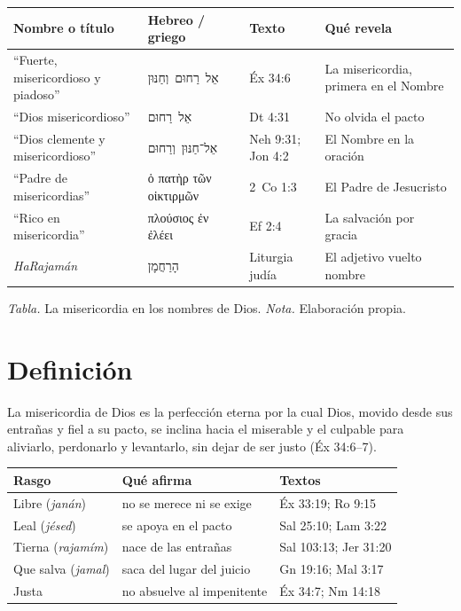 \documentclass[11pt,letterpaper]{article}
\newcommand{\heb}[1]{\mbox{\foreignlanguage{hebrew}{#1}}}
\newcommand{\grc}[1]{\foreignlanguage{ancientgreek}{#1}}
\begin{document}
\begin{center}
\small\renewcommand{\arraystretch}{1.2}
\begin{tabular}{@{}L{4.2cm}L{3.6cm}L{3.0cm}L{4.6cm}@{}}
\toprule
\textbf{Nombre o título} & \textbf{Hebreo / griego} & \textbf{Texto} & \textbf{Qué revela} \\ \midrule
``Fuerte, misericordioso y piadoso'' & \heb{אֵל רַחוּם וְחַנּוּן} & Éx 34:6 & La misericordia, primera en el Nombre \\
``Dios misericordioso'' & \heb{אֵל רַחוּם} & Dt 4:31 & No olvida el pacto \\
``Dios clemente y misericordioso'' & \heb{אֵל־חַנּוּן וְרַחוּם} & Neh 9:31; Jon 4:2 & El Nombre en la oración \\
``Padre de misericordias'' & \grc{ὁ πατὴρ τῶν οἰκτιρμῶν} & 2~Co 1:3 & El Padre de Jesucristo \\
``Rico en misericordia'' & \grc{πλούσιος ἐν ἐλέει} & Ef 2:4 & La salvación por gracia \\
\emph{HaRajamán} & \heb{הָרַחֲמָן} & Liturgia judía & El adjetivo vuelto nombre \\ \bottomrule
\end{tabular}\par\smallskip
{\footnotesize\color{gris}\textit{Tabla.} La misericordia en los nombres de Dios. \textit{Nota.} Elaboración propia.}
\end{center}

\section{Definición}

\begin{tcolorbox}[colback=papiro,colframe=azul,boxrule=1pt,arc=3pt,fonttitle=\bfseries,title=Definición]
La misericordia de Dios es la perfección eterna por la cual Dios, movido desde sus entrañas y fiel a su pacto, se inclina hacia el miserable y el culpable para aliviarlo, perdonarlo y levantarlo, sin dejar de ser justo (Éx 34:6--7).
\end{tcolorbox}

\begin{center}\small\renewcommand{\arraystretch}{1.2}
\begin{tabular}{@{}L{3.4cm}L{6.6cm}L{4.4cm}@{}}
\toprule
\textbf{Rasgo} & \textbf{Qué afirma} & \textbf{Textos} \\ \midrule
Libre (\emph{janán}) & no se merece ni se exige & Éx 33:19; Ro 9:15 \\
Leal (\emph{jésed}) & se apoya en el pacto & Sal 25:10; Lam 3:22 \\
Tierna (\emph{rajamím}) & nace de las entrañas & Sal 103:13; Jer 31:20 \\
Que salva (\emph{jamal}) & saca del lugar del juicio & Gn 19:16; Mal 3:17 \\
Justa & no absuelve al impenitente & Éx 34:7; Nm 14:18 \\
\bottomrule
\end{tabular}\end{center}
\end{document}
